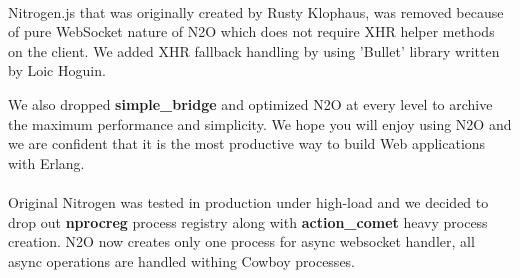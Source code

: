 \paragraph{}
Nitrogen.js that was originally created by Rusty Klophaus,
was removed because of pure WebSocket nature of N2O which does not
require XHR helper methods on the client. We added XHR fallback
handling by using 'Bullet' library written by Loic Hoguin.

We also dropped {\bf simple\_bridge} and optimized N2O at every level to
archive the maximum performance and simplicity. We hope you will enjoy
using N2O and we are confident that it is the most productive way to
build Web applications with Erlang.

\paragraph{}
Original Nitrogen was tested in production under high-load and we decided to drop out
{\bf nprocreg} process registry along with {\bf{action\_comet}} heavy process creation. N2O now creates
only one process for async websocket handler, all async operations are handled withing
Cowboy processes.
